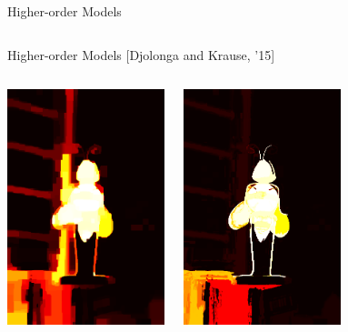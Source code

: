 \documentclass[mathserif]{beamer}
\newcommand{\qcite}[1]{{\scriptsize\color{col2}[#1]}}
\begin{document}
\begin{frame}{Higher-order Models}
\begin{columns}[c]

\end{columns}
\end{frame}

\begin{frame}{Higher-order Models \qcite{Djolonga and Krause, '15}}
\vspace{0.5em}
\begin{columns}[c]
\centering
\includegraphics[width=1.8in]{figures/bee_dr1.png}

\centering
\includegraphics[width=1.8in]{figures/bee_marginals.png}
\end{columns}
\end{frame}
\end{document}
